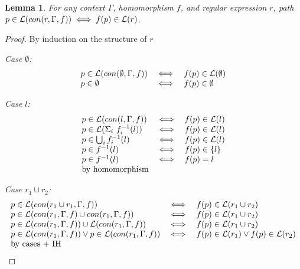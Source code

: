 \documentclass[twocolumn, openany]{sig-alternate-10pt}
\newtheorem{lem}[thm]{Lemma}
\begin{document}

\vspace{1em}
\begin{lem}
  For any context $\Gamma$, homomorphism $f$, and regular expression $r$, 
  path $p \in \mathcal{L}(con(r,\Gamma,f)) \iff f(p) \in \mathcal{L}(r)$.
\end{lem}
\begin{proof}
By induction on the structure of $r$

\emph{Case $\emptyset$:}
  \[ \begin{array}{lll}
    p \in \mathcal{L}(con(\emptyset,\Gamma,f)) &\iff& f(p) \in \mathcal{L}(\emptyset) \\
    p \in \emptyset &\iff& f(p) \in \emptyset \\
  \end{array} \]

\emph{Case $l$:}
  \[ \begin{array}{lll}
    p \in \mathcal{L}(con(l,\Gamma,f)) &\iff& f(p) \in \mathcal{L}(l) \\
    p \in \mathcal{L}(\Sigma_i ~ f_i^{-1}(l)) &\iff& f(p) \in \mathcal{L}(l) \\
    p \in \bigcup_i f_i^{-1}(l) &\iff& f(p) \in \mathcal{L}(l) \\
    p \in f^{-1}(l) &\iff& f(p) \in \{ l \} \\
    p \in f^{-1}(l) &\iff& f(p) = l \\
    \text{by homomorphism} & & \\
  \end{array} \]

\emph{Case $r_1 \cup r_2$:}
  \[ \begin{array}{lll}
    p \in \mathcal{L}(con(r_1 \cup r_1,\Gamma,f)) &\iff& f(p) \in \mathcal{L}(r_1 \cup r_2) \\
    p \in \mathcal{L}(con(r_1,\Gamma,f) \cup con(r_1,\Gamma,f)) &\iff& f(p) \in \mathcal{L}(r_1 \cup r_2) \\
    p \in \mathcal{L}(con(r_1,\Gamma,f)) \cup \mathcal{L}(con(r_1,\Gamma,f)) &\iff& f(p) \in \mathcal{L}(r_1 \cup r_2) \\
    p \in \mathcal{L}(con(r_1,\Gamma,f)) \vee p \in \mathcal{L}(con(r_1,\Gamma,f)) 
       &\iff& 
       f(p) \in \mathcal{L}(r_1) \vee f(p) \in \mathcal{L}(r_2) \\
    \text{by cases + IH} & & \\
  \end{array} \]


\end{proof}
\end{document}
